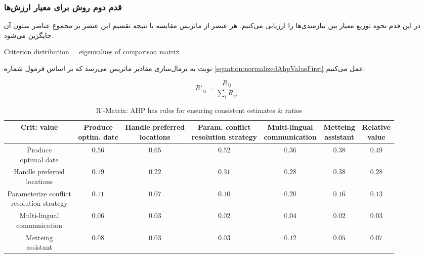 \subsubsection{قدم دوم روش  برای معیار ارزش‌ها}

در این فدم نحوه توزیع معیار بین نیازمندی‌ها را ارزیابی می‌کنیم. هر عنصر از
ماتریس مقایسه با نتیجه تقسیم این عتصر بر مجموع عناصر ستون آن جایگزین می‌شود.

\begin{LTR}
    Criterion distribution = eigenvalues of comparison matrix
\end{LTR}

نوبت به نرمال‌سازی مقادیر ماتریس می‌رسد که بر اساس فرمول شماره
\ref{equation:normalizedAhpValueFirst} عمل می‌کنیم:

\begin{equation}
    R'_{ij} = \frac{R_{ij}}{\sum_{i}R_{ij}} 
    \label{equation:normalizedAhpValueFirst}
\end{equation}

\begin{LTR}
    \begin{table}[H]
        \centering
        \begin{tabular}{ccccccc} Crit: value & \makecell{Produce \\ optim. date} & \makecell{Handle preferred \\ locations} & \makecell{Param. conflict \\ resolution strategy} & \makecell{Multi-lingual \\ communication} & \makecell{Metteing \\ assistant} & \makecell{Relative \\ value} \\ \hline
            \makecell{Produce \\ optimal date} & $0.56$ & $0.65$ & $0.52$ & $0.36$ & $0.38$ & $0.49$ \\ \hline
            \makecell{Handle preferred \\ locations} & $0.19$ & $0.22$ & $0.31$ & $0.28$ & $0.38$ & $0.28$ \\ \hline
            \makecell{Parameterize conflict \\ resolution strategy} & $0.11$ & $0.07$ & $0.10$ & $0.20$ & $0.16$ & $0.13$ \\ \hline
            \makecell{Multi-lingual \\ communication} & $0.06$ & $0.03$ & $0.02$ & $0.04$ & $0.02$ & $0.03$ \\ \hline
            \makecell{Metteing \\ assistant} & $0.08$ & $0.03$ & $0.03$ & $0.12$ & $0.05$ & $0.07$ \\
        \end{tabular}
        \caption{R'-Matrix: AHP has rules for ensuring consistent estimates \&
        ratios}
        \label{fig:ahpValueStep2}
    \end{table}
\end{LTR}

